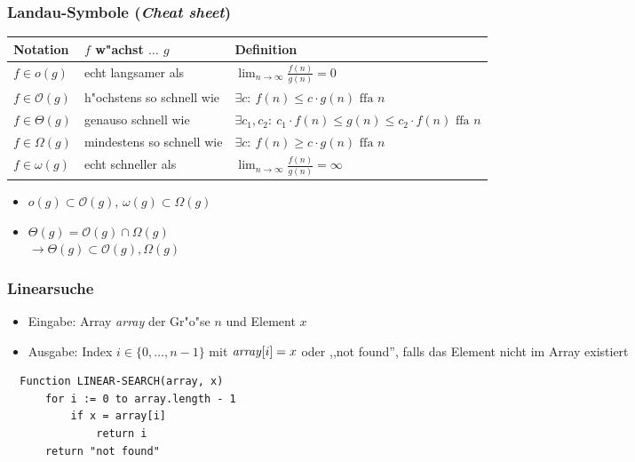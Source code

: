 \documentclass[t]{beamer}
\newcommand{\bigO}{\ensuremath{\mathcal{O}}}
\begin{document}
\begin{frame}
  \frametitle{Landau-Symbole (\emph{Cheat sheet})}
  \begin{center}
  \begin{tabular}{| l || l | l |} \hline
  \textbf{Notation} & \textbf{$f$ w"achst $\ldots$ $g$} & \textbf{Definition} \\ \hline
  $f \in o(g)$
      & echt langsamer als
      & $\lim_{n\rightarrow \infty} \frac{f(n)}{g(n)} = 0$
      \\ \hline
  $f \in \bigO(g)$
      & \footnotesize h"ochstens so schnell wie \normalsize
      & $\exists c: \ f(n) \leq c\cdot g(n) \text{ ffa } n$
      \\ \hline
  $f \in \Theta(g)$
      & genauso schnell wie
      & \footnotesize $\exists c_1, c_2: \ c_1\cdot f(n) \leq g(n) \leq c_2 \cdot f(n) \text{ ffa } n$ \normalsize
      \\ \hline
  $f \in \Omega(g)$
      & \footnotesize mindestens so schnell wie \normalsize
      & $\exists c: \ f(n) \geq c\cdot g(n) \text{ ffa } n$
      \\ \hline
  $f \in \omega(g)$
      & echt schneller als
      & $\lim_{n\rightarrow \infty} \frac{f(n)}{g(n)} = \infty$
      \\ \hline
  \end{tabular}
  \end{center}
  \begin{itemize}
  \item $o(g) \subset \bigO(g)$, $\omega(g) \subset \Omega(g)$
  \item $\Theta(g) = \bigO(g) \cap \Omega(g)$ \\[0.5em]
        \quad $\rightarrow \Theta(g) \subset \bigO(g), \Omega(g)$
  \end{itemize}
\end{frame}

\begin{frame}[fragile]
  \frametitle{Linearsuche}
  \begin{itemize}
  \item Eingabe: Array \emph{array} der Gr"o"se $n$ und Element $x$
  \item Ausgabe: Index $i \in \{0,\ldots,n-1\}$ mit $\text{\emph{array}}[i] = x$
                 oder ,,not found'', falls das Element nicht im Array existiert
  \end{itemize}
  \begin{lstlisting}
  Function LINEAR-SEARCH(array, x)
      for i := 0 to array.length - 1
          if x = array[i]
              return i
      return "not found"
  \end{lstlisting}
\end{frame}
\end{document}
